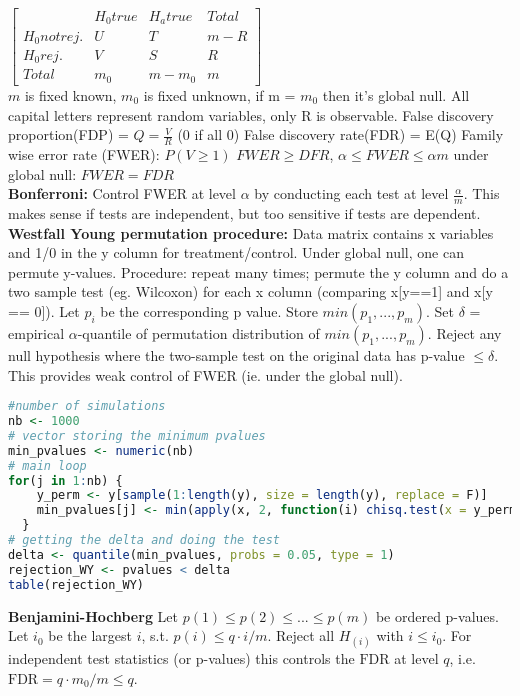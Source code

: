 $\begin{bmatrix}
& H_0 true & H_a true& Total \\
H_0 not rej. & U & T & m-R\\
H_0rej. & V & S & R \\
Total & m_0 & m-m_0 & m
\end{bmatrix}$\\
$m$ is fixed known, $m_0$ is fixed unknown, if m = $m_0$ then it's global null. All capital letters represent random variables, only R is observable. 
False discovery proportion(FDP) = $Q = \frac{V}{R}$ (0 if all 0)
False discovery rate(FDR) = E(Q) 
Family wise error rate (FWER): $P(V \geq 1)$
$FWER \geq DFR$, $\alpha \leq FWER \leq \alpha m$ under global null: $FWER = FDR$ \\
\textbf{Bonferroni: } Control FWER at level $\alpha$ by conducting each test at level $\frac{\alpha}{m}$. This makes sense if tests are independent, but too sensitive if tests are dependent.  \\
\textbf{Westfall Young permutation procedure: } Data matrix contains x variables and 1/0 in the y column for treatment/control. Under global null, one can permute y-values. Procedure: repeat many times; permute the y column and do a two sample test (eg. Wilcoxon) for each x column (comparing x[y==1] and x[y == 0]). Let $p_i$ be the corresponding p value. Store $min(p_1,...,p_m)$. Set $\delta$ = empirical $\alpha$-quantile of permutation distribution of $min(p_1,...,p_m)$. Reject any null hypothesis where the two-sample test on the original data has p-value $\leq \delta$. This provides weak control of FWER (ie. under the global null). 
\begin{lstlisting}[language=R]
#number of simulations
nb <- 1000
# vector storing the minimum pvalues
min_pvalues <- numeric(nb)
# main loop
for(j in 1:nb) {
    y_perm <- y[sample(1:length(y), size = length(y), replace = F)]
    min_pvalues[j] <- min(apply(x, 2, function(i) chisq.test(x = y_perm,y = i)$p.value))
  }
# getting the delta and doing the test
delta <- quantile(min_pvalues, probs = 0.05, type = 1)
rejection_WY <- pvalues < delta
table(rejection_WY)
\end{lstlisting}

\textbf{Benjamini-Hochberg}
Let $p(1)\leq p(2) \leq ... \leq p(m)$ be ordered p-values. Let $i_0$ be the largest $i$, s.t. $p(i)\leq q\cdot i / m$. Reject all $H_{(i)}$ with $i\leq i_0$. For independent test statistics (or p-values) this controls the $\text{FDR}$ at level $q$, i.e. $\text{FDR}=q\cdot m_0 / m \leq q$.
